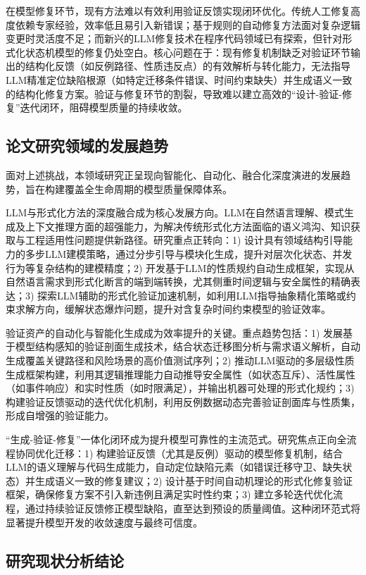 在模型修复环节，现有方法难以有效利用验证反馈实现闭环优化。传统人工修复高度依赖专家经验，效率低且易引入新错误；基于规则的自动修复方法面对复杂逻辑变更时灵活度不足；而新兴的LLM修复技术在程序代码领域已有探索，但针对形式化状态机模型的修复仍处空白。核心问题在于：现有修复机制缺乏对验证环节输出的结构化反馈（如反例路径、性质违反点）的有效解析与转化能力，无法指导LLM精准定位缺陷根源（如特定迁移条件错误、时间约束缺失）并生成语义一致的结构化修复方案。验证与修复环节的割裂，导致难以建立高效的“设计-验证-修复”迭代闭环，阻碍模型质量的持续收敛。

\subsection{论文研究领域的发展趋势}
\label{section-analysis-trend}

面对上述挑战，本领域研究正呈现向智能化、自动化、融合化深度演进的发展趋势，旨在构建覆盖全生命周期的模型质量保障体系。

LLM与形式化方法的深度融合成为核心发展方向。LLM在自然语言理解、模式生成及上下文推理方面的超强能力，为解决传统形式化方法面临的语义鸿沟、知识获取与工程适用性问题提供新路径。研究重点正转向：1) 设计具有领域结构引导能力的多步LLM建模策略，通过分步引导与模块化生成，提升对层次化状态、并发行为等复杂结构的建模精度；2) 开发基于LLM的性质规约自动生成框架，实现从自然语言需求到形式化断言的端到端转换，尤其侧重时间逻辑与安全属性的精确表达；3) 探索LLM辅助的形式化验证加速机制，如利用LLM指导抽象精化策略或约束求解方向，缓解状态爆炸问题，提升对含复杂时间约束模型的验证效率。

验证资产的自动化与智能化生成成为效率提升的关键。重点趋势包括：1) 发展基于模型结构感知的验证剖面生成技术，结合状态迁移图分析与需求语义解析，自动生成覆盖关键路径和风险场景的高价值测试序列；2) 推动LLM驱动的多层级性质生成框架构建，利用其逻辑推理能力自动推导安全属性（如状态互斥）、活性属性（如事件响应）和实时性质（如时限满足），并输出机器可处理的形式化规约；3) 构建验证反馈驱动的迭代优化机制，利用反例数据动态完善验证剖面库与性质集，形成自增强的验证能力。

“生成-验证-修复”一体化闭环成为提升模型可靠性的主流范式。研究焦点正向全流程协同优化迁移：1) 构建验证反馈（尤其是反例）驱动的模型修复机制，结合LLM的语义理解与代码生成能力，自动定位缺陷元素（如错误迁移守卫、缺失状态）并生成语义一致的修复建议；2) 设计基于时间自动机理论的形式化修复验证框架，确保修复方案不引入新违例且满足实时性约束；3) 建立多轮迭代优化流程，通过持续验证反馈修正模型缺陷，直至达到预设的质量阈值。这种闭环范式将显著提升模型开发的收敛速度与最终可信度。

\subsection{研究现状分析结论}
\label{section-analysis-conclusion}


